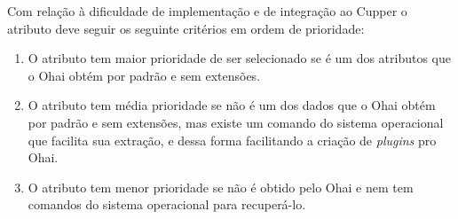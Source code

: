 Com relação à dificuldade de implementação e de integração ao Cupper o
atributo deve seguir os seguinte critérios em ordem de prioridade:

\begin{enumerate}
\item O atributo tem maior prioridade de ser selecionado se é um dos atributos 
que o Ohai obtém por padrão e sem extensões.
\item O atributo tem média prioridade se não é um dos dados que o Ohai
obtém por padrão e sem extensões, mas existe um comando do sistema operacional que facilita 
sua extração, e dessa forma facilitando a criação de \textit{plugins} pro 
Ohai.
\item O atributo tem menor prioridade se não é obtido pelo Ohai e nem tem 
comandos do sistema operacional para recuperá-lo.
\end{enumerate}

